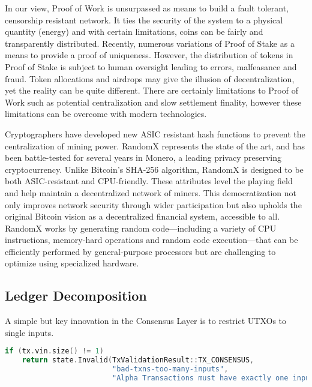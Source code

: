 \documentclass{article}
\begin{document}
\vspace{2mm}

In our view, Proof of Work is unsurpassed as means to build a fault tolerant, censorship resistant network. It ties the security of the system to a physical quantity (energy) and with certain limitations, coins can be fairly and transparently distributed. Recently, numerous variations of Proof of Stake as a means to provide a proof of uniqueness. However, the distribution of tokens in Proof of Stake is subject to human oversight leading to errors, malfeasance and fraud. Token allocations and airdrops may give the illusion of decentralization, yet the reality can be quite different. There are certainly limitations to Proof of Work such as potential centralization and slow settlement finality, however these limitations can be overcome with modern technologies. 

\vspace{2mm}

Cryptographers have developed new ASIC resistant hash functions to prevent the centralization of mining power.  RandomX represents the state of the art, and has been battle-tested for several years in Monero, a leading privacy preserving cryptocurrency. Unlike Bitcoin's SHA-256 algorithm, RandomX is designed to be both ASIC-resistant and CPU-friendly.  These attributes level the playing field and help maintain a decentralized network of miners. This democratization not only improves network security through wider participation but also upholds the original Bitcoin vision as a decentralized financial system, accessible to all. RandomX works by generating random code---including a variety of CPU instructions, memory-hard operations and random code execution---that can be efficiently performed by general-purpose processors but are challenging to optimize using specialized hardware. 




\subsection*{Ledger Decomposition}


A simple but key innovation in the Consensus Layer is to restrict UTXOs to single inputs.

\begin{center}
\begin{lstlisting}[language=C++, linewidth=0.8\textwidth]
if (tx.vin.size() != 1)
    return state.Invalid(TxValidationResult::TX_CONSENSUS, 
                         "bad-txns-too-many-inputs", 
                         "Alpha Transactions must have exactly one input");
\end{lstlisting}
\end{center}
\end{document}
